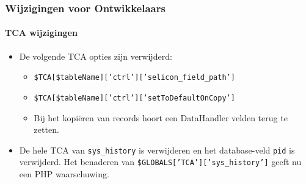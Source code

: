 
\begin{frame}[fragile]
	\frametitle{Wijzigingen voor Ontwikkelaars}
	\framesubtitle{TCA wijzigingen}

	\begin{itemize}
		\item De volgende TCA opties zijn verwijderd:

			\begin{itemize}
				\item \texttt{\$TCA[\$tableName]['ctrl']['selicon\_field\_path']}
				\item \texttt{\$TCA[\$tableName]['ctrl']['setToDefaultOnCopy']}
			\end{itemize}

			\begin{itemize}\smaller
				\item[\ding{228}] Bij het kopiëren van records hoort een DataHandler velden terug te zetten.
			\end{itemize}\normalsize

		\item De hele TCA van \texttt{sys\_history} is verwijderen en het database-veld \texttt{pid} is verwijderd.
			Het benaderen van \texttt{\$GLOBALS['TCA']['sys\_history']} geeft nu een PHP waarschuwing.

	\end{itemize}

\end{frame}


